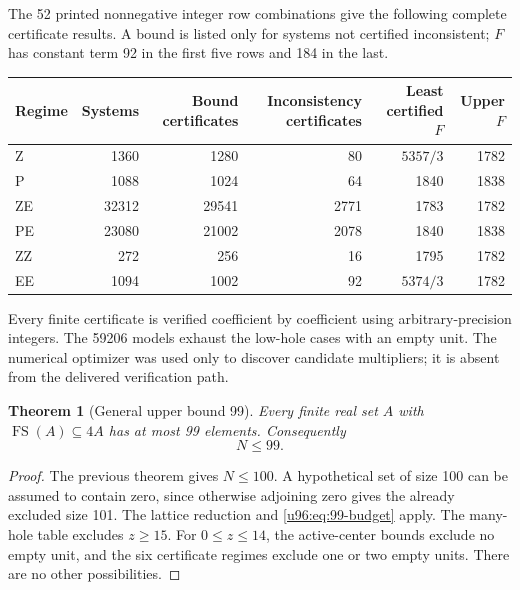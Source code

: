 \documentclass[11pt,a4paper]{article}
\newtheorem{theorem}{Theorem}[section]
\theoremstyle{remark}
\newcommand{\FS}{\operatorname{FS}}
\begin{document}
The 52 printed nonnegative integer row combinations give the following
complete certificate results. A bound is listed only for systems not
certified inconsistent; $F$ has constant term 92 in the first five rows
and 184 in the last.
\begin{center}\small
\begin{tabular}{lrrrrr}
\toprule
Regime&Systems&Bound certificates&Inconsistency certificates&Least certified $F$&Upper $F$\\
\midrule
Z&1360&1280&80&$5357/3$&1782\\
P&1088&1024&64&1840&1838\\
ZE&32312&29541&2771&1783&1782\\
PE&23080&21002&2078&1840&1838\\
ZZ&272&256&16&1795&1782\\
EE&1094&1002&92&$5374/3$&1782\\
\bottomrule
\end{tabular}
\end{center}
Every finite certificate is verified coefficient by coefficient using
arbitrary-precision integers. The 59206 models exhaust the low-hole cases
with an empty unit. The numerical optimizer was used only to discover
candidate multipliers; it is absent from the delivered verification path.

\begin{theorem}[General upper bound 99]\label{u96:thm:upper99}
Every finite real set $A$ with $\FS(A)\subseteq4A$ has at most 99 elements.
Consequently
\[
 \boxed{N\leq99}.
\]
\end{theorem}
\begin{proof}
The previous theorem gives $N\leq100$. A hypothetical set of size 100
can be assumed to contain zero, since otherwise adjoining zero gives the
already excluded size 101. The lattice reduction and
\eqref{u96:eq:99-budget} apply. The many-hole table excludes $z\geq15$.
For $0\leq z\leq14$, the active-center bounds exclude no empty unit,
and the six certificate regimes exclude one or two empty units.
There are no other possibilities. 
\end{proof}
\end{document}
